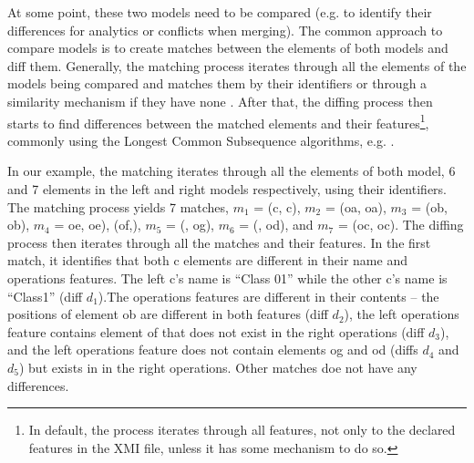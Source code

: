 \documentclass{llncs}
\begin{document}
At some point, these two models need to be compared (e.g. to identify their differences for analytics or conflicts when merging). The common approach to compare models is to create matches between the elements of both models and diff them. Generally, the matching process iterates through all the elements of the models being compared and matches them by their identifiers or through a similarity mechanism if they have none \cite{DBLP:conf/sfm/BroschKLSWW12,emfcompare2018developer}. After that, the diffing process then starts to find differences between the matched elements and their features\footnote{In default, the process iterates through all features, not only to the declared features in the XMI file, unless it has some mechanism to do so.}, commonly using the Longest Common Subsequence algorithms, e.g. \cite{DBLP:journals/algorithmica/Meyers86}. 

In our example, the matching iterates through all the elements of both model, 6 and 7 elements in the left and right models respectively, using their identifiers. The matching process yields 7 matches, $m_1$ = (\textsf{c}, \textsf{c}), $m_2$ = (\textsf{oa}, \textsf{oa}), $m_3$ = (\textsf{ob}, \textsf{ob}), $m_4$ = {\textsf{oe}, \textsf{oe}), (\textsf{of},), $m_5$ = (, \textsf{og}), $m_6$ = (, \textsf{od}), and $m_7$ = (\textsf{oc}, \textsf{oc}). The diffing process then iterates through all the matches and their features. In the first match, it identifies that both \textsf{c} elements are different in their \textsf{name} and \textsf{operations} features. The left \textsf{c}'s \textsf{name} is ``Class 01'' while the other \textsf{c}'s \textsf{name} is ``Class1'' (diff $d_1$).The \textsf{operations} features are different in their contents -- the positions of element \textsf{ob} are different in both features (diff $d_2$), the left \textsf{operations} feature contains element \textsf{of} that does not exist in the right \textsf{operations} (diff $d_3$}), and the left \textsf{operations} feature does not contain elements \textsf{og} and \textsf{od} (diffs $d_4$ and $d_5$) but exists in in the right \textsf{operations}. Other matches doe not have any differences.
\end{document}
